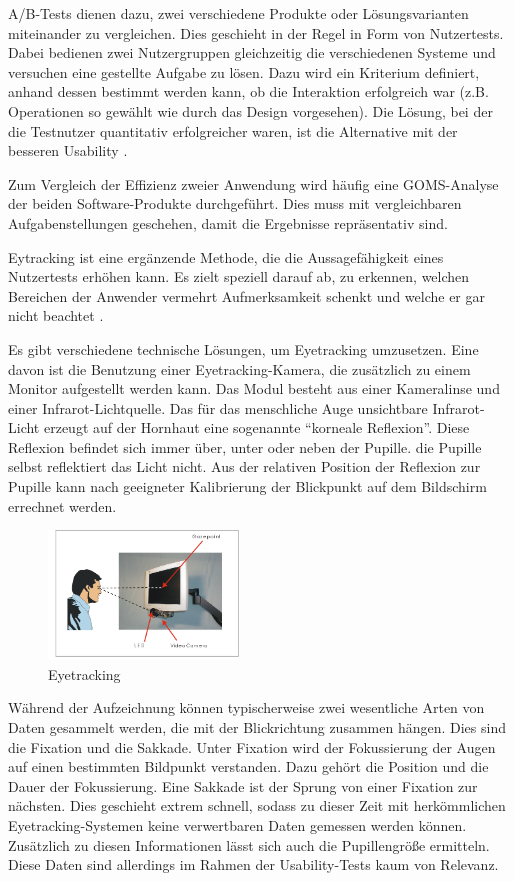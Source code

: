 A/B-Tests dienen dazu, zwei verschiedene Produkte oder Lösungsvarianten miteinander zu vergleichen. Dies geschieht in der Regel in Form von Nutzertests. Dabei bedienen zwei Nutzergruppen gleichzeitig die verschiedenen Systeme und versuchen eine gestellte Aufgabe zu lösen. Dazu wird ein Kriterium definiert, anhand dessen bestimmt werden kann, ob die Interaktion erfolgreich war (z.B. Operationen so gewählt wie durch das Design vorgesehen). Die Lösung, bei der die Testnutzer quantitativ erfolgreicher waren, ist die Alternative mit der besseren Usability \cite[S. 240]{Ullenboom2014}.\par
Zum Vergleich der Effizienz zweier Anwendung wird häufig eine GOMS-Analyse der beiden Software-Produkte durchgeführt. Dies muss mit vergleichbaren Aufgabenstellungen geschehen, damit die Ergebnisse repräsentativ sind.\par
{}
Eytracking ist eine ergänzende Methode, die die Aussagefähigkeit eines Nutzertests erhöhen kann. Es zielt speziell darauf ab, zu erkennen, welchen Bereichen der Anwender vermehrt Aufmerksamkeit schenkt und welche er gar nicht beachtet \cite{Henrici2010}.\par
Es gibt verschiedene technische Lösungen, um Eyetracking umzusetzen. Eine davon ist die Benutzung einer Eyetracking-Kamera, die zusätzlich zu einem Monitor aufgestellt werden kann. Das Modul besteht aus einer Kameralinse und einer Infrarot-Lichtquelle. Das für das menschliche Auge unsichtbare Infrarot-Licht erzeugt auf der Hornhaut eine sogenannte \enquote{korneale Reflexion}. Diese Reflexion befindet sich immer über, unter oder neben der Pupille. die Pupille selbst reflektiert das Licht nicht. Aus der relativen Position der Reflexion zur Pupille kann nach geeigneter Kalibrierung der Blickpunkt auf dem Bildschirm errechnet werden.\par
\begin{figure}[H]
 \centering
 \includegraphics[width=0.45\textwidth]{grafiken/eyegaze.png}
 \caption{Eyetracking \cite{Eyegaze}}
 \label{fig:eyetracking}
\end{figure}
Während der Aufzeichnung können typischerweise zwei wesentliche Arten von Daten gesammelt werden, die mit der Blickrichtung zusammen hängen. Dies sind die Fixation und die Sakkade. Unter Fixation wird der Fokussierung der Augen auf einen bestimmten Bildpunkt verstanden. Dazu gehört die Position und die Dauer der Fokussierung. Eine Sakkade ist der Sprung von einer Fixation zur nächsten. Dies geschieht extrem schnell, sodass zu dieser Zeit mit herkömmlichen Eyetracking-Systemen keine verwertbaren Daten gemessen werden können. Zusätzlich zu diesen Informationen lässt sich auch die Pupillengröße ermitteln. Diese Daten sind allerdings im Rahmen der Usability-Tests kaum von Relevanz.\par
